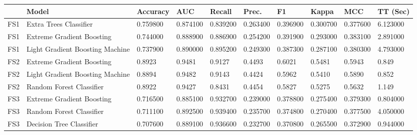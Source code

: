 ﻿\begin{table}[!ht]
    \centering
    \begin{tabular}{|l|l|l|l|l|l|l|l|l|l|}
    \hline
        ~ & Model & Accuracy & AUC & Recall & Prec. & F1 & Kappa & MCC & TT (Sec) \\ \hline
        FS1 & Extra Trees Classifier & 0.759800 & 0.874100 & 0.839200 & 0.263400 & 0.396900 & 0.300700 & 0.377600 & 6.123000 \\ \hline
        FS1 & Extreme Gradient Boosting & 0.744000 & 0.888900 & 0.886900 & 0.254200 & 0.391900 & 0.293000 & 0.383100 & 2.891000 \\ \hline
        FS1 & Light Gradient Boosting Machine & 0.737900 & 0.890000 & 0.895200 & 0.249300 & 0.387300 & 0.287100 & 0.380300 & 4.793000 \\ \hline
        FS2 & Extreme Gradient Boosting & 0.8923 & 0.9481 & 0.9127 & 0.4493 & 0.6021 & 0.5481 & 0.5943 & 0.849 \\ \hline
        FS2 & Light Gradient Boosting Machine & 0.8894 & 0.9482 & 0.9143 & 0.4424 & 0.5962 & 0.5410 & 0.5890 & 0.852 \\ \hline
        FS2 & Random Forest Classifier & 0.8922 & 0.9427 & 0.8431 & 0.4454 & 0.5827 & 0.5275 & 0.5632 & 1.149 \\ \hline
        FS3 & Extreme Gradient Boosting & 0.716500 & 0.885100 & 0.932700 & 0.239000 & 0.378800 & 0.275400 & 0.379300 & 0.804000 \\ \hline
        FS3 & Random Forest Classifier & 0.711100 & 0.892500 & 0.939400 & 0.235700 & 0.374800 & 0.270400 & 0.377500 & 4.050000 \\ \hline
        FS3 & Decision Tree Classifier & 0.707600 & 0.889100 & 0.936600 & 0.232700 & 0.370800 & 0.265500 & 0.372900 & 0.944000 \\ \hline
    \end{tabular}
\end{table}